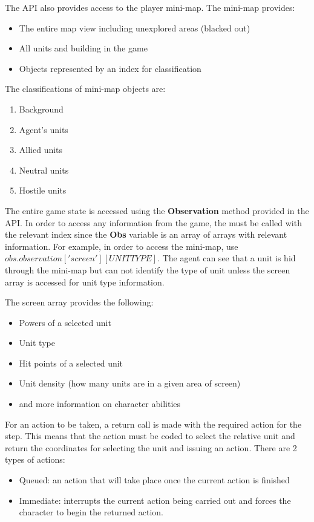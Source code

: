 The API also provides access to the player mini-map. The mini-map provides:

\begin{itemize}
    \item The entire map view including unexplored areas (blacked out)
    \item All units and building in the game
    \item Objects represented by an index for classification
\end{itemize}

The classifications of mini-map objects are:
\begin{enumerate}
    \item Background
    \item Agent's units
    \item Allied units
    \item Neutral units
    \item Hostile units
\end{enumerate}

The entire game state is accessed using the \textbf{Observation} method provided in the API\@.
In order to access any information from the game, the must be called with the
relevant index since the \textbf{Obs} variable is an array of arrays with
relevant information. For example, in order to access the mini-map,
use $obs.observation['screen'][UNITTYPE]$. The agent can see that a
unit is hid through the mini-map but can not identify the type of
unit unless the screen array is accessed for unit type information.

The screen array provides the following:

\begin{itemize}
    \item Powers of a selected unit
    \item Unit type
    \item Hit points of a selected unit
    \item Unit density (how many units are in a given area of screen)
    \item and more information on character abilities
\end{itemize}

For an action to be taken, a return call is made with the required action for the step.
This means that the action must be coded to select the relative unit and return the coordinates
for selecting the unit and issuing an action. There are 2 types of actions:

\begin{itemize}
    \item Queued: an action that will take place once the current
        action is finished
    \item Immediate: interrupts the current action being carried out and
        forces the character to begin the returned action.
\end{itemize}

